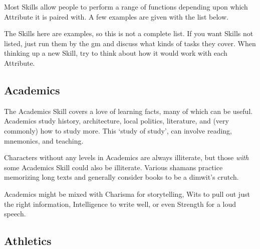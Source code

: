 \begin{multicols}{2}
Most Skills allow people to perform a range of functions depending upon which Attribute it is paired with. A few examples are given with the list below.

The Skills here are examples, so this is not a complete list.
If you want Skills not listed, just run them by the \gls{gm} and discuss what kinds of tasks they cover.
When thinking up a new Skill, try to think about how it would work with each Attribute.

\subsection{Academics}


The Academics Skill covers a love of learning facts, many of which can be useful.
Academics study history, architecture, local politics, literature, and (very commonly) how to study more.
This `study of study', can involve reading, mnemonics, and teaching.

Characters without any levels in Academics are always illiterate, but those \emph{with} some Academics Skill could also be illiterate.
Various shamans practice memorizing long texts and generally consider books to be a dimwit's crutch.

Academics might be mixed with Charisma for storytelling, Wits to pull out just the right information, Intelligence to write well, or even Strength for a loud speech.

\subsection{Athletics}


\end{multicols}
